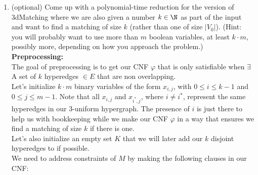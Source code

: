 \documentclass[11pt]{article}
\begin{document}
\begin{enumerate}
\begin{enumerate}
\item (optional) Come up with a polynomial-time reduction for the version of 3dMatching where we are also given a number $k\in \N$ as part of the input and want to find a matching of size $k$ (rather than one of size $|V_0|$).  (Hint: you will probably want to use more than $m$ boolean variables, at least $k\cdot m$, possibly more, depending on how you approach the problem.) \\

\textbf{Preprocessing: } \\

The goal of preprocessing is to get our CNF $\varphi$ that is only satisfiable when $\exists$ A set of $k$ hyperedges $\in E$ that are non overlapping. \\

Let's initialize $k \cdot m$ binary variables of the form $x_{i,j}$, with $0 \leq i \leq k-1$ and $0 \leq j \leq m-1$. Note that all $x_{i,j}$ and $x_{i^*, j}$, where $i \ne i^*$, represent the same hyperedges in our 3-uniform hypergraph. The presence of $i$ is just there to help us with bookkeeping while we make our CNF $\varphi$ in a way that ensures we find a matching of size $k$ if there is one. \\

Let's also initialize an empty set $K$ that we will later add our $k$ disjoint hyperedges to if possible. \\

We need to address constraints of $M$ by making the following clauses in our CNF: \\


\end{enumerate}
\end{enumerate}
\end{document}

